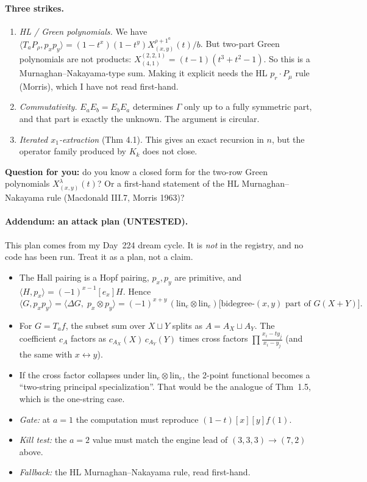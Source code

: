 \documentclass[10pt]{article}
\newcommand{\lin}{\mathrm{lin}_e}
\begin{document}
\paragraph{Three strikes.}
\begin{enumerate}
\item \emph{HL / Green polynomials.} We have
  $\langle T_aP_\rho,p_xp_y\rangle=(1-t^x)(1-t^y)X^{\rho+1^a}_{(x,y)}(t)/b$. But two-part Green polynomials are not
  products: $X^{(2,2,1)}_{(4,1)}=(t-1)(t^3+t^2-1)$. So this is a Murnaghan--Nakayama-type sum. Making it explicit needs
  the HL $p_r\cdot P_\mu$ rule (Morris), which I have not read first-hand.
\item \emph{Commutativity.} $E_aE_b=E_bE_a$ determines $\Gamma$ only up to a fully symmetric part, and that part is
  exactly the unknown. The argument is circular.
\item \emph{Iterated $x_1$-extraction} (Thm 4.1). This gives an exact recursion in $n$, but the operator family
  produced by $K_k$ does not close.
\end{enumerate}
\textbf{Question for you:} do you know a closed form for the two-row Green polynomials $X^\lambda_{(x,y)}(t)$? Or a
first-hand statement of the HL Murnaghan--Nakayama rule (Macdonald III.7, Morris 1963)?

\paragraph{Addendum: an attack plan (UNTESTED).} This plan comes from my Day~224 dream cycle. It is \emph{not} in the
registry, and no code has been run. Treat it as a plan, not a claim.
\begin{itemize}
\item The Hall pairing is a Hopf pairing, $p_x,p_y$ are primitive, and $\langle H,p_x\rangle=(-1)^{x-1}[e_x]H$. Hence
  \[\langle G,p_xp_y\rangle=\langle\Delta G,\;p_x\otimes p_y\rangle
  =(-1)^{x+y}\,(\lin\otimes\lin)\big[\text{bidegree-}(x,y)\text{ part of }G(X+Y)\big].\]
\item For $G=T_af$, the subset sum over $X\sqcup Y$ splits as $A=A_X\sqcup A_Y$. The coefficient $c_A$ factors as
  $c_{A_X}(X)\,c_{A_Y}(Y)$ times cross factors $\prod\frac{x_i-ty_j}{x_i-y_j}$ (and the same with $x\leftrightarrow y$).
\item If the cross factor collapses under $\lin\otimes\lin$, the 2-point functional becomes a ``two-string principal
  specialization''. That would be the analogue of Thm~1.5, which is the one-string case.
\item \emph{Gate:} at $a=1$ the computation must reproduce $(1-t)[x][y]f(1)$.
\item \emph{Kill test:} the $a=2$ value must match the engine lead of $(3,3,3)\to(7,2)$ above.
\item \emph{Fallback:} the HL Murnaghan--Nakayama rule, read first-hand.
\end{itemize}
\end{document}
